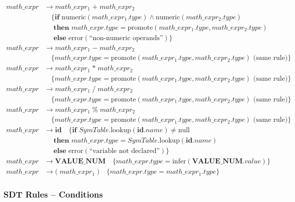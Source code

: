 \documentclass[letterpaper,12pt,oneside]{article}
\begin{document}
\begin{align*}
math\_expr &\rightarrow math\_expr_1 \; \mathbf{+} \; math\_expr_2 \\
           &\quad \{\textbf{if } \text{numeric}(math\_expr_1.type) \land \text{numeric}(math\_expr_2.type) \\
           &\quad \textbf{ then } math\_expr.type = \text{promote}(math\_expr_1.type, math\_expr_2.type) \\
           &\quad \textbf{ else } \text{error}(\text{``non-numeric operands''})\} \\[6pt]
math\_expr &\rightarrow math\_expr_1 \; \mathbf{-} \; math\_expr_2 \\
           &\quad \{math\_expr.type = \text{promote}(math\_expr_1.type, math\_expr_2.type) \text{ (same rule)}\} \\[6pt]
math\_expr &\rightarrow math\_expr_1 \; \mathbf{*} \; math\_expr_2 \\
           &\quad \{math\_expr.type = \text{promote}(math\_expr_1.type, math\_expr_2.type) \text{ (same rule)}\} \\[6pt]
math\_expr &\rightarrow math\_expr_1 \; \mathbf{/} \; math\_expr_2 \\
           &\quad \{math\_expr.type = \text{promote}(math\_expr_1.type, math\_expr_2.type) \text{ (same rule)}\} \\[6pt]
math\_expr &\rightarrow math\_expr_1 \; \mathbf{\%} \; math\_expr_2 \\
           &\quad \{math\_expr.type = \text{promote}(math\_expr_1.type, math\_expr_2.type) \text{ (same rule)}\} \\[10pt]
math\_expr &\rightarrow \mathbf{id} \quad \{\textbf{if } SymTable.\text{lookup}(\mathbf{id}.name) \neq \text{null} \\
           &\quad \textbf{ then } math\_expr.type = SymTable.\text{lookup}(\mathbf{id}.name) \\
           &\quad \textbf{ else } \text{error}(\text{``variable not declared''})\} \\[6pt]
math\_expr &\rightarrow \mathbf{VALUE\_NUM} \quad \{math\_expr.type = \text{infer}(\mathbf{VALUE\_NUM}.value)\} \\[6pt]
math\_expr &\rightarrow \mathbf{(} \; math\_expr_1 \; \mathbf{)} \quad \{math\_expr.type = math\_expr_1.type\}
\end{align*}

\subsubsection{SDT Rules -- Conditions}
\end{document}
